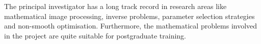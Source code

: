\documentclass[enabledeprecatedfontcommands,cleardoublepage=empty,headsepline,twoside,11pt,DIV=15,BCOR=12mm,final]{scrartcl}
\begin{document}


The principal investigator %
has a long track record in research areas like mathematical image processing, inverse problems, parameter selection strategies and non-smooth optimisation.
Furthermore, the mathematical problems involved in the project are quite suitable for postgraduate training.




\end{document}
